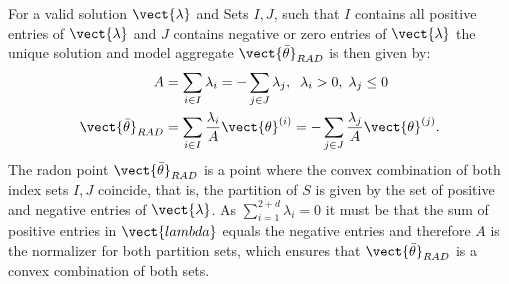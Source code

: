 For a valid solution $\vect{\lambda}$ and Sets $I,J$, such that $I$ contains all positive entries of $\vect{\lambda}$ and $J$ contains negative or zero entries of $\vect{\lambda}$ the unique solution and model aggregate $\vect{\bar{\theta}}_{RAD}$ is then given by:
\begin{equation}
    \label{eq:radonpoint}
    \begin{split}
    A &= \sum_{i\in I} \lambda_i = - \sum_{j\in J} \lambda_j, \; \;\lambda_i > 0, \; \lambda_j \leq 0 \\
    \vect{\bar{\theta}}_{RAD} &= \sum_{i\in I} \frac{\lambda_i}{A} \vect{\theta}^{(i)} = - \sum_{j\in J} \frac{\lambda_j}{A} \vect{\theta}^{(j)}.
    \end{split}
\end{equation}
The radon point $\vect{\bar{\theta}}_{RAD}$ is a point where the convex combination of both index sets $I, J$ coincide, that is, the partition of $S$ is given by the set of positive and negative entries of $\vect{\lambda}$.
As $\sum_{i=1}^{2+d} \lambda_i = 0$ it must be that the sum of positive entries in $\vect{lambda}$ equals the negative entries and therefore $A$ is the normalizer for both partition sets, which ensures that $\vect{\bar{\theta}}_{RAD}$ is a convex combination of both sets.

